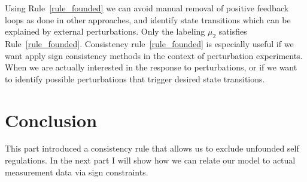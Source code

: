 Using Rule~\ref{rule_founded} we can avoid manual removal of positive
 feedback loops as done in other approaches, and identify state transitions which can be explained by external perturbations.
Only the labeling $\mu_2$ satisfies Rule~\ref{rule_founded}.
Consistency rule~\ref{rule_founded} is especially useful if we want apply sign consistency methods in the context of perturbation experiments.
When we are actually interested in the response to perturbations,
or if we want to identify possible perturbations that trigger desired state transitions.

\section*{Conclusion}

This part introduced a consistency rule that allows us to exclude unfounded self regulations.
In the next part I will show how we can relate our model to actual measurement data via sign constraints.
